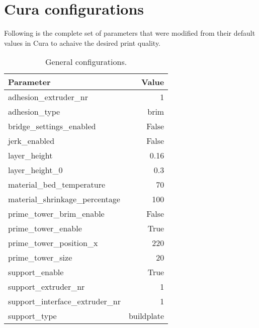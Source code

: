 \section{Cura configurations}
\label{sec:cura_configurations}
Following is the complete set of parameters that were modified from their default values in Cura to achaive the desired print quality.
\begin{table}[H]
    \centering
    \scriptsize
    \begin{tabular}{ |l|r| }
        \hline
        \textbf{Parameter}               & \textbf{Value} \\
        \hline
        adhesion\_extruder\_nr           & 1              \\
        adhesion\_type                   & brim           \\
        bridge\_settings\_enabled        & False          \\
        jerk\_enabled                    & False          \\
        layer\_height                    & 0.16           \\
        layer\_height\_0                 & 0.3            \\
        material\_bed\_temperature       & 70             \\
        material\_shrinkage\_percentage  & 100            \\
        prime\_tower\_brim\_enable       & False          \\
        prime\_tower\_enable             & True           \\
        prime\_tower\_position\_x        & 220            \\
        prime\_tower\_size               & 20             \\
        support\_enable                  & True           \\
        support\_extruder\_nr            & 1              \\
        support\_interface\_extruder\_nr & 1              \\
        support\_type                    & buildplate     \\
        \hline
    \end{tabular}
    \caption{General configurations.}
\end{table}
\pagebreak
